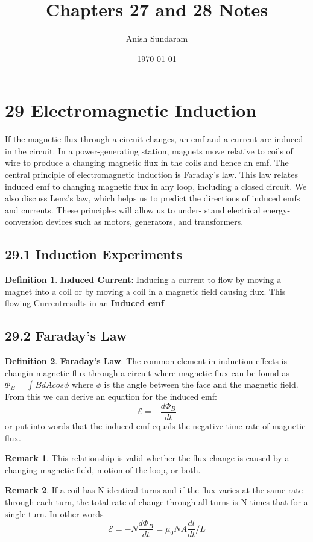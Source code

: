 \documentclass[12pt]{amsart}
\title{Chapters 27 and 28 Notes}
\author{Anish Sundaram}
\date{\today}
\theoremstyle{definition}
\newtheorem{definition}{Definition} %
\newtheorem*{remark}{Remark}        %
\numberwithin{equation}{theorem}    %
\begin{document}
\maketitle

\tableofcontents

\section*{29 Electromagnetic Induction}

If the magnetic flux through a circuit changes, an emf and a current are induced in the circuit. In a power-generating station, magnets move relative to coils of wire to produce a changing magnetic flux in the coils and hence an emf.
The central principle of electromagnetic induction is Faraday’s law. This law relates induced emf to changing magnetic flux in any loop, including a closed circuit. We also discuss Lenz’s law, which helps us to predict the directions of induced emfs and currents. These principles will allow us to under- stand electrical energy-conversion devices such as motors, generators, and transformers.


\subsection*{29.1 Induction Experiments}

\begin{definition}
    \textbf{Induced Current}:
    Inducing a current to flow by moving a magnet into a coil or by moving a coil
    in a magnetic field causing flux. This flowing Currentresults in an \textbf{Induced emf}
\end{definition}

\subsection*{29.2 Faraday's Law}

\begin{definition}
    \textbf{Faraday’s Law}:
    The common element in induction effects is changin magnetic flux through a circuit
    where magnetic flux can be found as $\Phi_B = \int B dAcos\phi$ where $\phi$ is the angle between the face and the magnetic field. From this we can derive an equation for the induced emf: 
    $$\mathcal{E} = -\frac{d\Phi_B}{dt}$$ or put into words that the induced emf equals the negative time rate of magnetic flux.
    \begin{remark}
        This relationship is valid whether the flux change is caused by a changing magnetic field, motion of the loop, or both.
    \end{remark}
    \begin{remark}
    If a coil has N identical turns and if the flux varies at the same rate through each turn, the total rate of change through all turns is N times that for a single turn. In other words $$\mathcal{E} = -N\frac{d\Phi_B}{dt} = \mu_0NA\frac{dl}{dt}/L$$
    \end{remark}
\end{definition}
\end{document}
